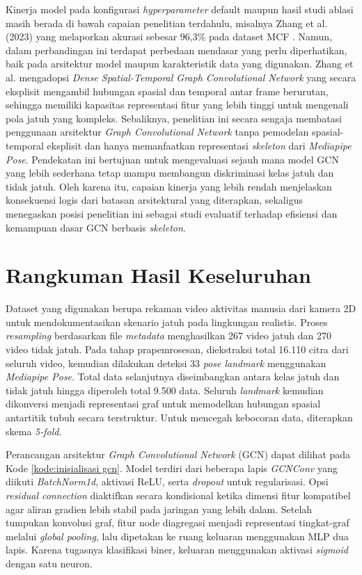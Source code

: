 Kinerja model pada konfigurasi \textit{hyperparameter} default maupun hasil studi ablasi masih berada di bawah capaian penelitian terdahulu, misalnya Zhang et al. (2023) yang melaporkan akurasi sebesar 96,3\% pada dataset MCF \cite{Zhang2023}. Namun, dalam perbandingan ini terdapat perbedaan mendasar yang perlu diperhatikan, baik pada arsitektur model maupun karakteristik data yang digunakan. Zhang et al. mengadopsi \textit{Dense Spatial-Temporal Graph Convolutional Network} yang secara eksplisit mengambil hubungan spasial dan temporal antar frame berurutan, sehingga memiliki kapasitas representasi fitur yang lebih tinggi untuk mengenali pola jatuh yang kompleks. Sebaliknya, penelitian ini secara sengaja membatasi penggunaan arsitektur \textit{Graph Convolutional Network} tanpa pemodelan spasial-temporal eksplisit dan hanya memanfaatkan representasi \textit{skeleton} dari \textit{Mediapipe Pose}. Pendekatan ini bertujuan untuk mengevaluasi sejauh mana model GCN yang lebih sederhana tetap mampu membangun diskriminasi kelas jatuh dan tidak jatuh. Oleh karena itu, capaian kinerja yang lebih rendah menjelaskan konsekuensi logis dari batasan arsitektural yang diterapkan, sekaligus menegaskan posisi penelitian ini sebagai studi evaluatif terhadap efisiensi dan kemampuan dasar GCN berbasis \textit{skeleton}. \par


\section{Rangkuman Hasil Keseluruhan} \label{IV.Bahas}
Dataset yang digunakan berupa rekaman video aktivitas manusia dari kamera 2D untuk mendokumentasikan skenario jatuh pada lingkungan realistis. Proses \textit{resampling} berdasarkan file \textit{metadata} menghasilkan 267 video jatuh dan 270 video tidak jatuh. Pada tahap prapemrosesan, diekstraksi total 16.110 citra dari seluruh video, kemudian dilakukan deteksi 33 \textit{pose landmark} menggunakan \textit{Mediapipe Pose}. Total data selanjutnya diseimbangkan antara kelas jatuh dan tidak jatuh hingga diperoleh total 9.500 data. Seluruh \textit{landmark} kemudian dikonversi menjadi representasi graf untuk memodelkan hubungan spasial antartitik tubuh secara terstruktur. Untuk mencegah kebocoran data, diterapkan skema \textit{5-fold}. \par

Perancangan arsitektur \textit{Graph Convolutional Network} (GCN) dapat dilihat pada Kode \ref{kode:inisialisasi gcn}. Model terdiri dari beberapa lapis \textit{GCNConv} yang diikuti \textit{BatchNorm1d}, aktivasi ReLU, serta \textit{dropout} untuk regularisasi. Opsi \textit{residual connection} diaktifkan secara kondisional ketika dimensi fitur kompatibel agar aliran gradien lebih stabil pada jaringan yang lebih dalam. Setelah tumpukan konvolusi graf, fitur node diagregasi menjadi representasi tingkat-graf melalui \textit{global pooling}, lalu dipetakan ke ruang keluaran menggunakan MLP dua lapis. Karena tugasnya klasifikasi biner, keluaran menggunakan aktivasi \textit{sigmoid} dengan satu neuron. \par


